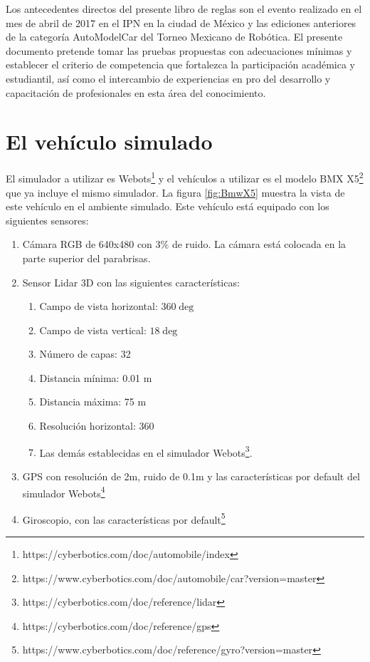 \documentclass[letterpaper,12pt]{article}
\begin{document}
Los antecedentes directos del presente libro de reglas son el evento realizado en el mes de abril de 2017 en el IPN en la ciudad de México y las ediciones anteriores de la categoría AutoModelCar del Torneo Mexicano de Robótica. El presente documento pretende tomar las pruebas propuestas con adecuaciones mínimas y establecer el criterio de competencia que fortalezca la participación académica y estudiantil, así como el intercambio de experiencias en pro del desarrollo y capacitación de profesionales en esta área del conocimiento.


\section{El vehículo simulado}

El simulador a utilizar es Webots\footnote{https://cyberbotics.com/doc/automobile/index} y el vehículos a utilizar es el modelo BMX X5\footnote{https://www.cyberbotics.com/doc/automobile/car?version=master} que ya incluye el mismo simulador. La figura \ref{fig:BmwX5} muestra la vista de este vehículo en el ambiente simulado. Este vehículo está equipado con los siguientes sensores:
\begin{enumerate}
\item Cámara RGB de 640x480 con 3\% de ruido. La cámara está colocada en la parte superior del parabrisas. 
\item Sensor Lidar 3D con las siguientes características:
  \begin{enumerate}
  \item Campo de vista horizontal: $360\deg$
  \item Campo de vista vertical: $18\deg$
  \item Número de capas: 32
  \item Distancia mínima: 0.01 m
  \item Distancia máxima: 75 m
  \item Resolución horizontal: 360
  \item Las demás establecidas en el simulador Webots\footnote{https://cyberbotics.com/doc/reference/lidar}.
  \end{enumerate}
\item GPS con resolución de 2m, ruido de 0.1m y las características por default del simulador Webots\footnote{https://cyberbotics.com/doc/reference/gps}
\item Giroscopio, con las características por default\footnote{https://www.cyberbotics.com/doc/reference/gyro?version=master}
\end{enumerate}
\end{document}
